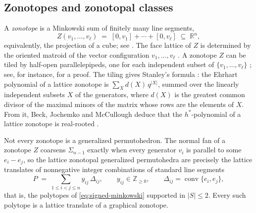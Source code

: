 \documentclass[11pt,a4paper,reqno]{amsart}
\theoremstyle{results}
\theoremstyle{definitions}
\def\Z{\mathbb{Z}}
\def\R{\mathbb{R}}
\def\Z{\mathbb{Z}}
\newcommand{\abs}[1]{\left\lvert#1\right\rvert}
\newcommand{\hstar}{h^{*}}
\begin{document}
\subsection{Zonotopes and zonotopal classes}
\label{sec:zonotopal-classes}
A \emph{zonotope} is a Minkowski sum of finitely many line segments,
\[
  Z(v_1, \ldots, v_\ell) \;=\; [0, v_1] + \cdots + [0, v_\ell] \;\subseteq\; \R^{n},
\]
equivalently, the projection of a cube; see
\cite[Lecture 7]{ziegler1995lectures}. The face lattice of $Z$ is determined by the oriented matroid of the vector configuration $v_1,\ldots,v_\ell$ \cite{bjorner1999oriented}.  A zonotope $Z$ can be tiled by half-open
parallelepipeds, one for each independent subset of $\{v_1, \ldots, v_\ell\}$
\cite[Theorem 54]{shephard1974combinatorial}; see, for instance,
\cite[Lemma 9.1]{beck2015computing} for a proof.  The tiling gives
Stanley's formula \cite[Theorem 2.2]{stanley1991zonotope}: the Ehrhart polynomial
of a lattice zonotope is $\sum_{X} d(X)\, q^{\abs{X}}$, summed over the linearly
independent subsets $X$ of the generators, where $d(X)$ is the greatest common
divisor of the maximal minors of the matrix whose rows are the elements of $X$.
From it, Beck, Jochemko and McCullough deduce
that the $\hstar$-polynomial of a lattice zonotope is real-rooted
\cite{beck2019h}.

Not every zonotope is a generalized permutohedron.  The normal fan of a zonotope $Z$
coarsens $\Sigma_{n-1}$ exactly when every generator $v_i$ is parallel to some
$e_i - e_j$, so the lattice zonotopal generalized permutohedra are precisely the
lattice translates of nonnegative integer combinations of standard line segments
\begin{equation}\label{eq:zonotope}
  P \;=\; \sum_{1 \leqslant i < j \leqslant n} y_{ij}\, \Delta_{ij},
  \qquad y_{ij} \in \Z_{\geqslant 0},
  \qquad \Delta_{ij} = \operatorname{conv}\{e_i, e_j\},
\end{equation}
that is, the polytopes of \eqref{eq:signed-minkowski} supported in
$|S| \leqslant 2$. Every such polytope is a lattice translate of a graphical zonotope.
\end{document}
